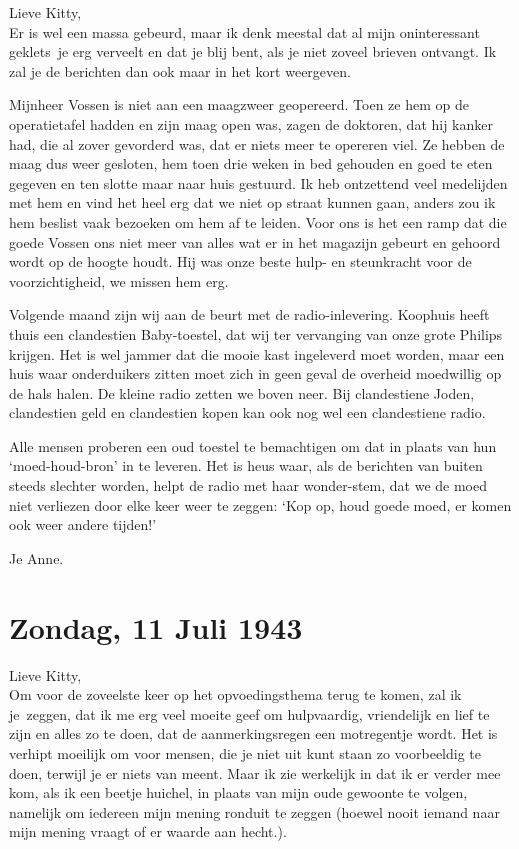 \documentclass{book}
\begin{document}
Lieve Kitty,\\
Er is wel een massa gebeurd, maar ik denk meestal dat al mijn
oninteressant geklets~je erg verveelt en dat je blij bent, als je niet zoveel
brieven ontvangt. Ik zal je de berichten dan ook maar in het kort weergeven.

Mijnheer Vossen is niet aan een maagzweer geopereerd. Toen ze hem op de
operatietafel hadden en zijn maag open was, zagen de doktoren, dat hij kanker
had, die al zover gevorderd was, dat er niets meer te opereren viel. Ze hebben
de maag dus weer gesloten, hem toen drie weken in bed gehouden en goed te eten
gegeven en ten slotte maar naar huis gestuurd.  Ik heb ontzettend veel
medelijden met hem en vind het heel erg dat we niet op straat kunnen gaan,
anders zou ik hem beslist vaak bezoeken om hem af te leiden. Voor ons is het een
ramp dat die goede Vossen ons niet meer van alles wat er in het magazijn gebeurt
en gehoord wordt op de hoogte houdt. Hij was onze beste hulp- en steunkracht
voor de voorzichtigheid, we missen hem erg.

Volgende maand zijn wij aan de beurt met de radio-inlevering. Koophuis heeft
thuis een clandestien Baby-toestel, dat wij ter vervanging van onze grote
Philips krijgen. Het is wel jammer dat die mooie kast ingeleverd moet worden,
maar een huis waar onderduikers zitten moet zich in geen geval de overheid
moedwillig op de hals halen. De kleine radio zetten we boven neer. Bij
clandestiene Joden, clandestien geld en clandestien kopen kan ook nog wel een
clandestiene radio.

Alle mensen proberen een oud toestel te bemachtigen om dat in plaats van hun
`moed-houd-bron' in te leveren. Het is heus waar, als de berichten van buiten
steeds slechter worden, helpt de radio met haar wonder-stem, dat we de moed niet
verliezen door elke keer weer te zeggen: `Kop op, houd goede moed, er komen ook
weer andere tijden!'

Je Anne.

\section*{Zondag, 11 Juli 1943}

Lieve Kitty,\\
Om voor de zoveelste keer op het opvoedingsthema terug te komen,
zal ik je~zeggen, dat ik me erg veel moeite geef om hulpvaardig, vriendelijk en
lief te zijn en alles zo te doen, dat de aanmerkingsregen een motregentje wordt.
Het is verhipt moeilijk om voor mensen, die je niet uit kunt staan zo
voorbeeldig te doen, terwijl je er niets van meent. Maar ik zie werkelijk in dat
ik er verder mee kom, als ik een beetje huichel, in plaats van mijn oude
gewoonte te volgen, namelijk om iedereen mijn mening ronduit te zeggen (hoewel
nooit iemand naar mijn mening vraagt of er waarde aan hecht.).
\end{document}

